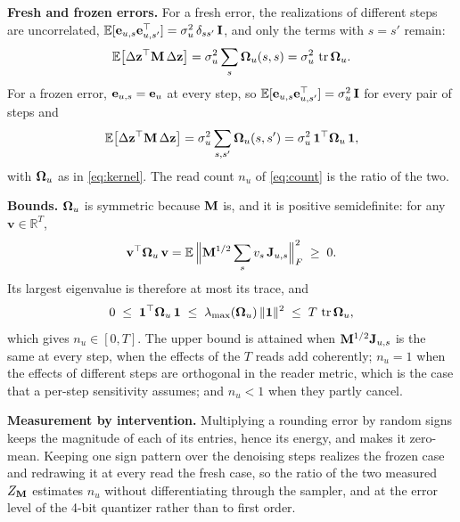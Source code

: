 \noindent\textbf{Fresh and frozen errors.}
For a fresh error, the realizations of different steps are uncorrelated, $\mathbb{E}[\mathbf{e}_{u,s}\mathbf{e}_{u,s'}^\top] = \sigma_u^2\, \delta_{ss'}\, \mathbf{I}$, and only the terms with $s = s'$ remain:
\begin{equation}
  \mathbb{E}\big[\Delta\mathbf{z}^\top \mathbf{M}\, \Delta\mathbf{z}\big] = \sigma_u^2 \sum_s \boldsymbol{\Omega}_u(s, s) = \sigma_u^2\, \operatorname{tr}\boldsymbol{\Omega}_u .
\end{equation}
For a frozen error, $\mathbf{e}_{u,s} = \mathbf{e}_u$ at every step, so $\mathbb{E}[\mathbf{e}_{u,s}\mathbf{e}_{u,s'}^\top] = \sigma_u^2\, \mathbf{I}$ for every pair of steps and
\begin{equation}
  \mathbb{E}\big[\Delta\mathbf{z}^\top \mathbf{M}\, \Delta\mathbf{z}\big] = \sigma_u^2 \sum_{s,s'} \boldsymbol{\Omega}_u(s, s') = \sigma_u^2\, \mathbf{1}^\top \boldsymbol{\Omega}_u\, \mathbf{1} ,
\end{equation}
with $\boldsymbol{\Omega}_u$ as in \cref{eq:kernel}.
The read count $n_u$ of \cref{eq:count} is the ratio of the two.

\noindent\textbf{Bounds.}
$\boldsymbol{\Omega}_u$ is symmetric because $\mathbf{M}$ is, and it is positive semidefinite: for any $\mathbf{v} \in \mathbb{R}^T$,
\begin{equation}
  \mathbf{v}^\top \boldsymbol{\Omega}_u\, \mathbf{v} = \mathbb{E}\,\Big\| \mathbf{M}^{1/2} \sum_s v_s\, \mathbf{J}_{u,s} \Big\|_F^2 \;\ge\; 0 .
\end{equation}
Its largest eigenvalue is therefore at most its trace, and
\begin{equation}
  0 \;\le\; \mathbf{1}^\top \boldsymbol{\Omega}_u\, \mathbf{1} \;\le\; \lambda_{\max}(\boldsymbol{\Omega}_u)\, \|\mathbf{1}\|^2 \;\le\; T\, \operatorname{tr}\boldsymbol{\Omega}_u ,
\end{equation}
which gives $n_u \in [0, T]$.
The upper bound is attained when $\mathbf{M}^{1/2}\mathbf{J}_{u,s}$ is the same at every step, \ie when the effects of the $T$ reads add coherently; $n_u = 1$ when the effects of different steps are orthogonal in the reader metric, which is the case that a per-step sensitivity assumes; and $n_u < 1$ when they partly cancel.

\noindent\textbf{Measurement by intervention.}
Multiplying a rounding error by random signs keeps the magnitude of each of its entries, hence its energy, and makes it zero-mean.
Keeping one sign pattern over the denoising steps realizes the frozen case and redrawing it at every read the fresh case, so the ratio of the two measured $Z_{\mathbf{M}}$ estimates $n_u$ without differentiating through the sampler, and at the error level of the 4-bit quantizer rather than to first order.

